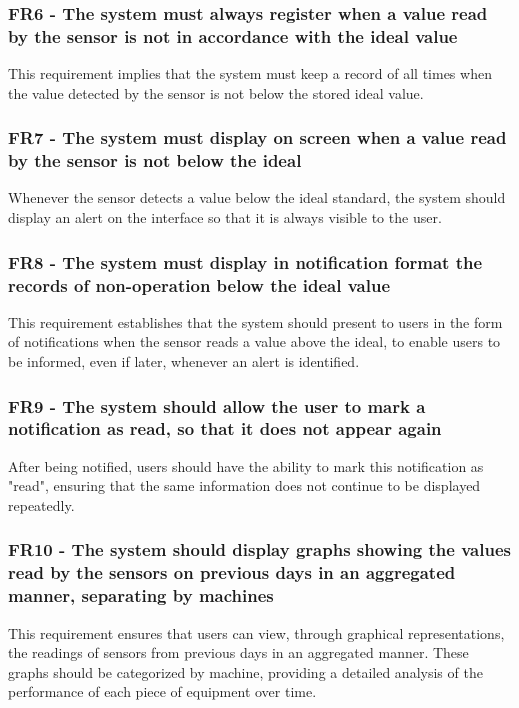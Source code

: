 \subsubsection{FR6 - The system must always register when a value read by the sensor is not in accordance with the ideal value}
This requirement implies that the system must keep a record of all times when the value detected by the sensor is not below the stored ideal value.

\subsubsection{FR7 - The system must display on screen when a value read by the sensor is not below the ideal}
Whenever the sensor detects a value below the ideal standard, the system should display an alert on the interface so that it is always visible to the user.

\subsubsection{FR8 - The system must display in notification format the records of non-operation below the ideal value}This requirement establishes that the system should present to users in the form of notifications when the sensor reads a value above the ideal, to enable users to be informed, even if later, whenever an alert is identified.

\subsubsection{FR9 - The system should allow the user to mark a notification as read, so that it does not appear again}
After being notified, users should have the ability to mark this notification as "read", ensuring that the same information does not continue to be displayed repeatedly.

\subsubsection{FR10 - The system should display graphs showing the values read by the sensors on previous days in an aggregated manner, separating by machines}This requirement ensures that users can view, through graphical representations, the readings of sensors from previous days in an aggregated manner. These graphs should be categorized by machine, providing a detailed analysis of the performance of each piece of equipment over time.

